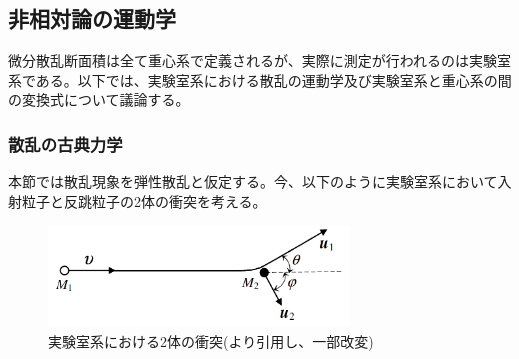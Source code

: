 \documentclass[a4paper,11pt,dvipdfmx]{jsarticle}
\begin{document}
\renewcommand\thefootnote{\arabic{footnote})}
\subsection{非相対論の運動学}
微分散乱断面積は全て重心系で定義されるが、実際に測定が行われるのは実験室系である。以下では、実験室系における散乱の運動学及び実験室系と重心系の間の変換式について議論する。
\subsubsection{散乱の古典力学}
本節では散乱現象を弾性散乱と仮定する。今、以下のように実験室系において入射粒子と反跳粒子の2体の衝突を考える。

\begin{figure}[tbh]
\centering
\includegraphics[width=8cm]{picture/nonrelativity/syototu.png}
\caption{実験室系における2体の衝突(\cite{ion}より引用し、一部改変)}
\label{fig:syototu}
\end{figure}
\end{document}
